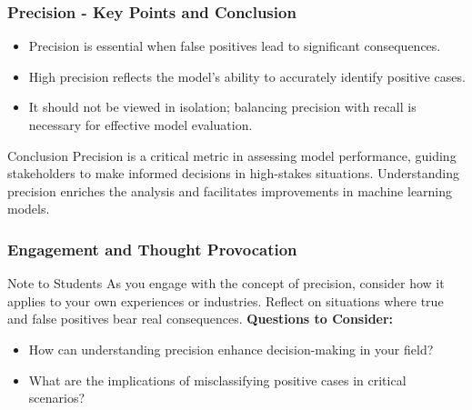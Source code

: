 \documentclass[aspectratio=169]{beamer}
\begin{document}
\begin{frame}[fragile]
    \frametitle{Precision - Key Points and Conclusion}
    \begin{itemize}
        \item Precision is essential when false positives lead to significant consequences.
        \item High precision reflects the model's ability to accurately identify positive cases.
        \item It should not be viewed in isolation; balancing precision with recall is necessary for effective model evaluation.
    \end{itemize}

    \begin{block}{Conclusion}
        Precision is a critical metric in assessing model performance, guiding stakeholders to make informed decisions in high-stakes situations. Understanding precision enriches the analysis and facilitates improvements in machine learning models.
    \end{block}
\end{frame}

\begin{frame}[fragile]
    \frametitle{Engagement and Thought Provocation}
    \begin{block}{Note to Students}
        As you engage with the concept of precision, consider how it applies to your own experiences or industries. Reflect on situations where true and false positives bear real consequences. 
        \newline
        \textbf{Questions to Consider:}
        \begin{itemize}
            \item How can understanding precision enhance decision-making in your field?
            \item What are the implications of misclassifying positive cases in critical scenarios?
        \end{itemize}
    \end{block}
\end{frame}
\end{document}
